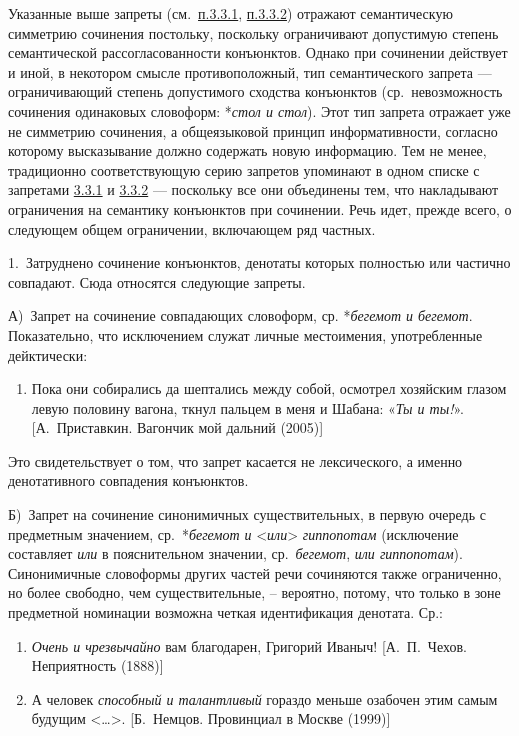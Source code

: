 Указанные выше запреты (см.~\underline{п.3.3.1}, \underline{п.3.3.2})
отражают семантическую симметрию сочинения постольку, поскольку
ограничивают допустимую степень семантической рассогласованности
конъюнктов. Однако при сочинении действует и иной, в некотором смысле
противоположный, тип семантического запрета --- ограничивающий степень
допустимого сходства конъюнктов (ср.~невозможность сочинения одинаковых
словоформ: *\textit{стол и стол}). Этот тип запрета отражает уже не
симметрию сочинения, а общеязыковой принцип информативности, согласно
которому высказывание должно содержать новую информацию. Тем не менее,
традиционно соответствующую серию запретов упоминают в одном списке с
запретами \underline{3.3.1} и \underline{3.3.2} --- поскольку все они
объединены тем, что накладывают ограничения на семантику конъюнктов при
сочинении. Речь идет, прежде всего, о следующем общем ограничении,
включающем ряд частных.

1.~Затруднено сочинение конъюнктов, денотаты которых полностью или
частично совпадают. Сюда относятся следующие запреты.

А)~Запрет на сочинение совпадающих словоформ, ср. *\textit{бегемот и
  бегемот}. Показательно, что исключением служат личные местоимения,
употребленные дейктически:

\begin{enumerate}
  \def\labelenumi{(\arabic{enumi})}
  \setcounter{enumi}{17}
  \item
        Пока они собирались да шептались между собой, осмотрел хозяйским
        глазом левую половину вагона, ткнул пальцем в меня и Шабана: «\textit{Ты
          и ты!}». {[}А.~Приставкин. Вагончик мой дальний (2005){]}
\end{enumerate}

Это свидетельствует о том, что запрет касается не лексического, а именно
денотативного совпадения конъюнктов.

Б)~Запрет на сочинение синонимичных существительных, в первую очередь с
предметным значением, ср.~*\textit{бегемот и}
\textless{}\textit{или}\textgreater{} \textit{гиппопотам} (исключение
составляет \textit{или} в пояснительном значении, ср.~\textit{бегемот},
\textit{или гиппопотам}). Синонимичные словоформы других частей речи
сочиняются также ограниченно, но более свободно, чем существительные, --
вероятно, потому, что только в зоне предметной номинации возможна четкая
идентификация денотата. Ср.:

\begin{enumerate}
  \def\labelenumi{(\arabic{enumi})}
  \setcounter{enumi}{18}
  \item
        \textit{Очень и чрезвычайно} вам благодарен, Григорий Иваныч!
        {[}А.~П.~Чехов. Неприятность (1888){]}
  \item
        А человек \textit{способный и талантливый} гораздо меньше озабочен этим
        самым будущим \textless\ldots\textgreater. {[}Б.~Немцов. Провинциал в
        Москве (1999){]}
\end{enumerate}

